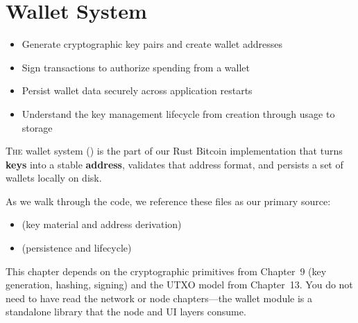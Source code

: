 \chapter{Wallet System}
\label{ch:wallet}

\begin{learnbox}
\begin{itemize}
  \item Generate cryptographic key pairs and create wallet addresses
  \item Sign transactions to authorize spending from a wallet
  \item Persist wallet data securely across application restarts
  \item Understand the key management lifecycle from creation through usage to storage
\end{itemize}
\end{learnbox}

\lettrine{T}{he} wallet system () is the part of our Rust Bitcoin implementation that turns \textbf{keys} into a stable \textbf{address}, validates that address format, and persists a set of wallets locally on disk.

As we walk through the code, we reference these files as our primary source:

\begin{itemize}
  \item {} (key material and address derivation)
  \item {} (persistence and lifecycle)
\end{itemize}

\begin{infobox}[Prerequisites]
This chapter depends on the cryptographic primitives from Chapter~9 (key generation, hashing, signing) and the UTXO model from Chapter~13. You do not need to have read the network or node chapters---the wallet module is a standalone library that the node and UI layers consume.
\end{infobox}

